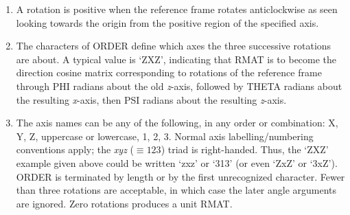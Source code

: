 {
}
\notes
{
 \begin{enumerate}
 \item A rotation is positive when the reference frame rotates
       anticlockwise as seen looking towards the origin from the
       positive region of the specified axis.
 \item The characters of ORDER define which axes the three successive
       rotations are about.  A typical value is `ZXZ', indicating that
       RMAT is to become the direction cosine matrix corresponding to
       rotations of the reference frame through PHI radians about the
       old {\it z}-axis, followed by THETA radians about the resulting
       {\it x}-axis,
       then PSI radians about the resulting {\it z}-axis.
 \item The axis names can be any of the following, in any order or
       combination:  X, Y, Z, uppercase or lowercase, 1, 2, 3.  Normal
       axis labelling/numbering conventions apply;  the {\it xyz} ($\equiv123$)
       triad is right-handed.  Thus, the `ZXZ' example given above
       could be written `zxz' or `313' (or even `ZxZ' or `3xZ').  ORDER
       is terminated by length or by the first unrecognized character.
       Fewer than three rotations are acceptable, in which case the later
       angle arguments are ignored.  Zero rotations produces a unit RMAT.
 \end{enumerate}
}
{
}
{
  \\
  \\
}
{
  \\
  \\
}
\notes
